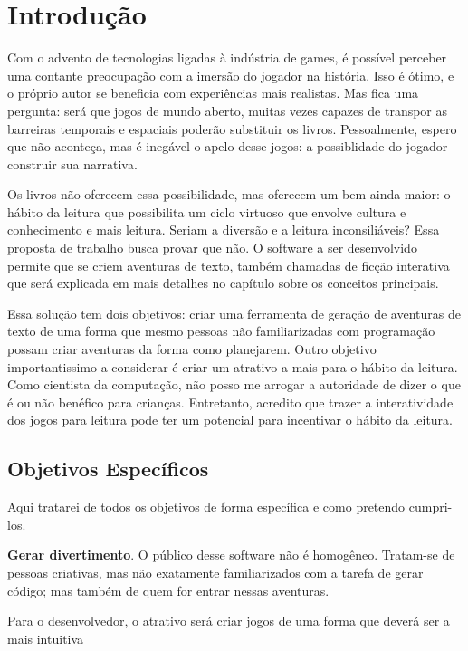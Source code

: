\chapter{Introdução}
\label{cap:introducao}

Com o advento de tecnologias  ligadas à indústria de games, é possível perceber uma contante
preocupação com a imersão do jogador na história. Isso é ótimo, e o próprio autor se beneficia
com experiências mais realistas. Mas fica uma pergunta: será que jogos de mundo aberto, muitas
vezes capazes de transpor as barreiras temporais e espaciais poderão substituir os livros.
Pessoalmente, espero que não aconteça, mas é inegável o apelo desse jogos: a possiblidade do
jogador construir sua narrativa.

Os livros não oferecem essa possibilidade, mas oferecem um bem ainda maior: o hábito da leitura que
possibilita um ciclo virtuoso que envolve cultura e conhecimento e mais leitura. Seriam a diversão
e a leitura inconsiliáveis? Essa proposta de trabalho busca provar que não. O software a ser desenvolvido
permite que se criem aventuras de texto, também chamadas de ficção interativa que será explicada em mais
detalhes no capítulo sobre os conceitos principais.

Essa solução tem dois objetivos: criar uma ferramenta de geração de aventuras de texto de uma forma que
mesmo pessoas não familiarizadas com programação possam criar aventuras da forma como planejarem. Outro
objetivo importantissimo a considerar é criar um atrativo a mais para o hábito da leitura. Como cientista
da computação, não posso me arrogar a autoridade de dizer o que é ou não benéfico para crianças. Entretanto,
acredito que trazer a interatividade dos jogos para leitura pode ter um potencial para incentivar o hábito
da leitura.


\section{Objetivos Específicos}
\label{sec:goals}

Aqui tratarei de todos os objetivos de forma específica e como pretendo cumpri-los.

\textbf{Gerar divertimento}. O público desse software não é homogêneo. Tratam-se de pessoas criativas, mas não
exatamente familiarizados com a tarefa de gerar código; mas também de quem for entrar nessas aventuras.

Para o desenvolvedor, o atrativo será criar jogos de uma forma que deverá ser a mais intuitiva   


